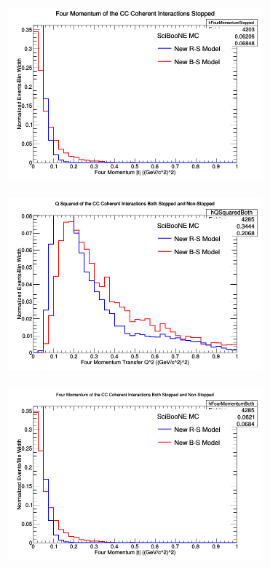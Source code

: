 \documentclass[11pt]{article}
\begin{document}
\begin{figure}[H]
\centering
\includegraphics[width=0.6\textwidth]{ANMFourSquaredPlottingImages/4-ANMFourSquaredPlotting.png}
\caption{}
\end{figure}

\begin{figure}[H]
\centering
\includegraphics[width=0.6\textwidth]{ANMFourSquaredPlottingImages/5-ANMFourSquaredPlotting.png}
\caption{}
\end{figure}

\begin{figure}[H]
\centering
\includegraphics[width=0.6\textwidth]{ANMFourSquaredPlottingImages/6-ANMFourSquaredPlotting.png}
\caption{}
\end{figure}



\end{document}
